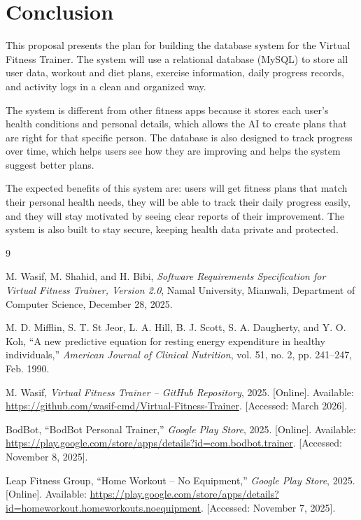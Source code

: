 \documentclass[12pt,a4paper]{article}
\begin{document}
\section{Conclusion}

This proposal presents the plan for building the database system for the Virtual Fitness
Trainer. The system will use a relational database (MySQL) to store all user data, workout
and diet plans, exercise information, daily progress records, and activity logs in a clean
and organized way.

The system is different from other fitness apps because it stores each user's health
conditions and personal details, which allows the AI to create plans that are right for
that specific person. The database is also designed to track progress over time, which
helps users see how they are improving and helps the system suggest better plans.

The expected benefits of this system are: users will get fitness plans that match their
personal health needs, they will be able to track their daily progress easily, and they
will stay motivated by seeing clear reports of their improvement. The system is also built
to stay secure, keeping health data private and protected.

\newpage
\begin{thebibliography}{9}

M. Wasif, M. Shahid, and H. Bibi,
\textit{Software Requirements Specification for Virtual Fitness Trainer, Version 2.0},
Namal University, Mianwali, Department of Computer Science, December 28, 2025.

M. D. Mifflin, S. T. St Jeor, L. A. Hill, B. J. Scott, S. A. Daugherty, and Y. O. Koh,
``A new predictive equation for resting energy expenditure in healthy individuals,''
\textit{American Journal of Clinical Nutrition}, vol. 51, no. 2, pp. 241--247, Feb. 1990.

M. Wasif,
\textit{Virtual Fitness Trainer -- GitHub Repository},
2025. [Online]. Available: \url{https://github.com/wasif-cmd/Virtual-Fitness-Trainer}.
[Accessed: March 2026].

BodBot,
``BodBot Personal Trainer,''
\textit{Google Play Store}, 2025. [Online]. Available:
\url{https://play.google.com/store/apps/details?id=com.bodbot.trainer}.
[Accessed: November 8, 2025].

Leap Fitness Group,
``Home Workout -- No Equipment,''
\textit{Google Play Store}, 2025. [Online]. Available:
\url{https://play.google.com/store/apps/details?id=homeworkout.homeworkouts.noequipment}.
[Accessed: November 7, 2025].

\end{thebibliography}
\end{document}
